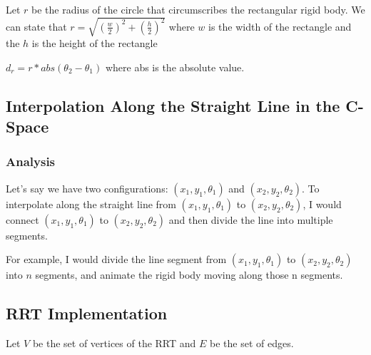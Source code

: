 \documentclass{article}
\begin{document}
Let $r$ be the radius of the circle that circumscribes the rectangular rigid body. We can state that $r = \sqrt{(\frac{w}{2})^2 + (\frac{h}{2})^2}$ where $w$ is the width of the rectangle and the $h$ is the height of the rectangle \newline 

$d_r = r * abs(\theta_2 - \theta_1)$ where abs is the absolute value. 

\subsection{Interpolation Along the Straight Line in the C-Space}
\subsubsection{Analysis}
Let's say we have two configurations: $(x_1, y_1, \theta_1)$ and $(x_2, y_2, \theta_2)$. To interpolate along the straight line from $(x_1, y_1, \theta_1)$ to  $(x_2, y_2, \theta_2)$, I would connect $(x_1, y_1, \theta_1)$ to  $(x_2, y_2, \theta_2)$ and then divide the line into multiple segments. \newline 

For example, I would divide the line segment from $(x_1, y_1, \theta_1)$ to  $(x_2, y_2, \theta_2)$ into $n$ segments, and animate the rigid body moving along those n segments. 

\subsection{RRT Implementation}

Let $V$ be the set of vertices of the RRT and $E$ be the set of edges. 
\end{document}
